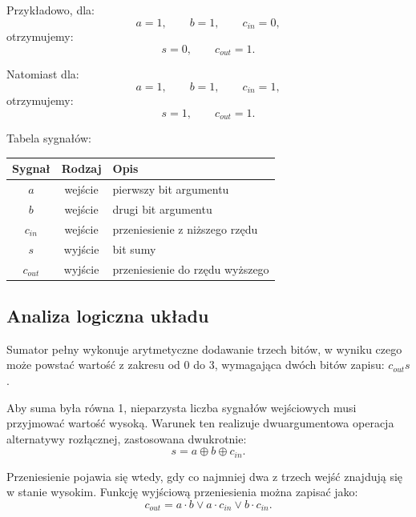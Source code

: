 \documentclass[12pt,a4paper]{article}
\begin{document}
Przykładowo, dla:
\begin{equation*}
a = 1, \qquad b = 1, \qquad c_{in} = 0,
\end{equation*}
otrzymujemy:
\begin{equation*}
s = 0, \qquad c_{out} = 1.
\end{equation*}

Natomiast dla:
\begin{equation*}
a = 1, \qquad b = 1, \qquad c_{in} = 1,
\end{equation*}
otrzymujemy:
\begin{equation*}
s = 1, \qquad c_{out} = 1.
\end{equation*}

\vspace{0.5em}
\noindent Tabela sygnałów:

\begin{center}
\begin{tabular}{|c|c|l|}
\hline
\textbf{Sygnał} & \textbf{Rodzaj} & \textbf{Opis} \\
\hline
$a$       & wejście & pierwszy bit argumentu \\
$b$       & wejście & drugi bit argumentu \\
$c_{in}$  & wejście & przeniesienie z niższego rzędu \\
$s$       & wyjście & bit sumy \\
$c_{out}$ & wyjście & przeniesienie do rzędu wyższego \\
\hline
\end{tabular}
\end{center}

\subsection{Analiza logiczna układu}

Sumator pełny wykonuje arytmetyczne dodawanie trzech bitów, w wyniku czego może powstać wartość z zakresu od 0 do 3, wymagająca dwóch bitów zapisu: $c_{out}s$.

Aby suma była równa 1, nieparzysta liczba sygnałów wejściowych musi przyjmować wartość wysoką. Warunek ten realizuje dwuargumentowa operacja alternatywy rozłącznej, zastosowana dwukrotnie:
\begin{equation*}
s = a \oplus b \oplus c_{in}.
\end{equation*}

Przeniesienie pojawia się wtedy, gdy co najmniej dwa z trzech wejść znajdują się w stanie wysokim. Funkcję wyjściową przeniesienia można zapisać jako:
\begin{equation*}
c_{out} = a \cdot b \vee a \cdot c_{in} \vee b \cdot c_{in}.
\end{equation*}
\end{document}
